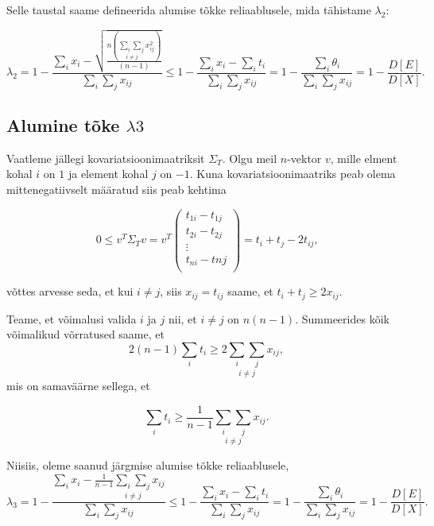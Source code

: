 \documentclass[a4paper,12pt]{article}
\numberwithin{equation}{section}
\theoremstyle{definition}
\begin{document}
Selle taustal saame defineerida alumise tõkke reliaablusele, mida tähistame $\lambda_2$:

\begin{equation*}
\lambda_2 = 1 - \frac{\sum_i x_i - \sqrt{\frac{ n \left( \underset{i \neq j}{\sum_i \sum_j} x_{ij}^2 \right) }{\left( n -1 \right)}}}{\sum_i \sum_j x_{ij}} \leq 1 - \frac{\sum_i x_i - \sum_i t_i}{\sum_i \sum_j x_{ij}} =   1 - \frac{\sum_i \theta_i}{\sum_i \sum_j x_{ij}} =  1 - \frac{D \left[ E \right]}{D \left[ X \right]} \text{.}
\end{equation*}


\subsection{Alumine tõke $\lambda3$}

Vaatleme jällegi kovariatsioonimaatriksit $\Sigma_T$. Olgu meil $n$-vektor $v$, mille elment kohal $i$ on $1$ ja element kohal $j$ on $-1$. Kuna kovariatsioonimaatriks peab olema mittenegatiivselt määratud siis peab kehtima

\begin{equation*}
\label{eq:psd 1 -1 vector}
0 \leq v^T \Sigma_T v = v^T 
\begin{pmatrix}
t_{1i} - t_{1j} \\
t_{2i} - t_{2j} \\
\vdots \\
t_{ni} - t{nj} \\
\end{pmatrix}
= t_{i} + t_{j} - 2 t_{ij} \text{,}
\end{equation*}

võttes arvesse seda, et kui $i \neq j$, siis $x_{ij} = t_{ij}$ saame, et $t_i + t_j \geq 2 x_{ij}$. 

Teame, et võimalusi valida $i$ ja $j$ nii, et $i \neq j$ on $n \left( n -1 \right)$. Summeerides kõik võimalikud võrratused saame, et
\begin{equation*}
2 \left( n - 1 \right) \sum_i t_i \geq 2  \underset{i \neq j}{\sum_i \sum_j} x_{ij},
\end{equation*}
mis on samaväärne sellega, et

\begin{equation*}
\sum_i t_i \geq  \frac{1}{n - 1} \underset{i \neq j}{\sum_i \sum_j} x_{ij}.
\end{equation*}


Niisiis, oleme saanud järgmise alumise tõkke reliaablusele, 
\begin{equation*}
\lambda_3 = 1 - \frac{\sum_i x_i - \frac{1}{n-1}{\underset{i \neq j}{\sum_i \sum_j} x_{ij}}}{\sum_i \sum_j x_{ij}} \leq  1 - \frac{\sum_i x_i - \sum_i t_i}{\sum_i \sum_j x_{ij}} =   1 - \frac{\sum_i \theta_i}{\sum_i \sum_j x_{ij}} =  1 - \frac{D \left[ E \right]}{D \left[ X \right]} \text{.}
\end{equation*}
\end{document}
